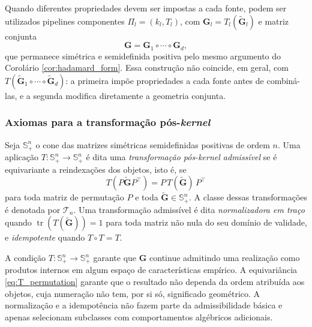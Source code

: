 \begin{remark}
\label{rem:component_transformations}
Quando diferentes propriedades devem ser impostas a cada fonte, podem ser utilizados pipelines componentes $\Pi_l = (k_l,T_l)$, com $\mathbf{G}_l = T_l(\widetilde{\mathbf{G}}_l)$ e matriz conjunta
\begin{equation}\label{eq:transformed_tensor_gram}
    \mathbf{G} = \mathbf{G}_1 \circ \cdots \circ \mathbf{G}_d,
\end{equation}
que permanece simétrica e semidefinida positiva pelo mesmo argumento do Corolário \ref{cor:hadamard_form}. Essa construção não coincide, em geral, com $T(\widetilde{\mathbf{G}}_1 \circ \cdots \circ \widetilde{\mathbf{G}}_d)$: a primeira impõe propriedades a cada fonte antes de combiná-las, e a segunda modifica diretamente a geometria conjunta.
\end{remark}

\subsubsection*{Axiomas para a transformação pós-\textit{kernel}}

\begin{definition}
\label{def:T_admissible}
Seja $\mathbb{S}_+^n$ o cone das matrizes simétricas semidefinidas positivas de ordem $n$. Uma aplicação $T: \mathbb{S}_+^n \to \mathbb{S}_+^n$ é dita uma \emph{transformação pós-\textit{kernel} admissível} se é equivariante a reindexações dos objetos, isto é, se
\begin{equation}\label{eq:T_permutation}
    T(P\widetilde{\mathbf{G}}P^\top) = P\,T(\widetilde{\mathbf{G}})\,P^\top
\end{equation}
para toda matriz de permutação $P$ e toda $\widetilde{\mathbf{G}}\in\mathbb{S}_+^n$. A classe dessas transformações é denotada por $\mathcal{T}_n$. Uma transformação admissível é dita \emph{normalizadora em traço} quando $\operatorname{tr}(T(\widetilde{\mathbf{G}})) = 1$ para toda matriz não nula do seu domínio de validade, e \emph{idempotente} quando $T\circ T = T$.
\end{definition}

\begin{remark}
\label{rem:T_axioms}
A condição $T: \mathbb{S}_+^n \to \mathbb{S}_+^n$ garante que $\mathbf{G}$ continue admitindo uma realização como produtos internos em algum espaço de características empírico. A equivariância \eqref{eq:T_permutation} garante que o resultado não dependa da ordem atribuída aos objetos, cuja numeração não tem, por si só, significado geométrico. A normalização e a idempotência não fazem parte da admissibilidade básica e apenas selecionam subclasses com comportamentos algébricos adicionais.
\end{remark}

